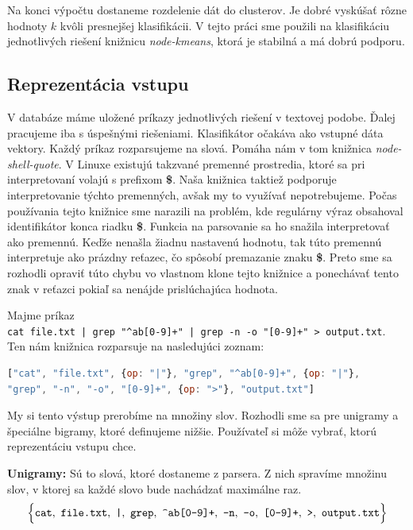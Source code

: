 Na konci výpočtu dostaneme rozdelenie dát do clusterov. Je dobré vyskúšať rôzne hodnoty
$k$ kvôli presnejšej klasifikácii.
V tejto práci sme použili na klasifikáciu jednotlivých riešení
knižnicu \textit{node-kmeans}, ktorá je stabilná a má dobrú podporu.

\subsection{Reprezentácia vstupu}
\label{sec:solutionclusterizing:inputrepresentation}

V databáze máme uložené príkazy
jednotlivých riešení v textovej podobe. Ďalej pracujeme iba s úspešnými riešeniami.
Klasifikátor očakáva ako vstupné dáta vektory. Každý príkaz rozparsujeme na slová.
Pomáha nám v tom knižnica \textit{node-shell-quote}. V Linuxe existujú takzvané
premenné prostredia, ktoré sa pri interpretovaní volajú s prefixom \textbf{\$}.
Naša knižnica taktiež podporuje interpretovanie týchto premenných, avšak my to
využívať nepotrebujeme. Počas používania tejto knižnice sme narazili na problém,
kde regulárny výraz obsahoval identifikátor konca riadku \textbf{\$}.
Funkcia na parsovanie sa ho snažila interpretovať ako premennú. Keďže nenašla žiadnu
nastavenú hodnotu, tak túto premennú interpretuje ako prázdny reťazec, čo spôsobí
premazanie znaku \textbf{\$}. Preto sme sa rozhodli opraviť túto chybu vo vlastnom
klone tejto knižnice a ponechávať tento znak v reťazci pokiaľ sa nenájde prislúchajúca
hodnota.
\begin{prikl}
	Majme príkaz \\
	\verb'cat file.txt | grep "^ab[0-9]+" | grep -n -o "[0-9]+" > output.txt'. \\
	Ten nám knižnica rozparsuje na nasledujúci zoznam:
\begin{lstlisting}[language=JavaScript]
["cat", "file.txt", {op: "|"}, "grep", "^ab[0-9]+", {op: "|"},
"grep", "-n", "-o", "[0-9]+", {op: ">"}, "output.txt"]
\end{lstlisting}
\end{prikl}
\noindent My si tento výstup prerobíme na množiny slov. Rozhodli sme sa pre
unigramy a špeciálne bigramy, ktoré definujeme nižšie. Používateľ si môže
vybrať, ktorú reprezentáciu vstupu chce.

\noindent\textbf{Unigramy:} Sú to slová, ktoré dostaneme z parsera. Z nich spravíme
množinu slov, v ktorej sa každé slovo bude nachádzať maximálne raz.
$$\Big\{\verb'cat',~\verb'file.txt',~\verb'|',~\verb'grep',~\verb'^ab[0-9]+',~ \verb'-n',~\verb'-o',~\verb'[0-9]+',~\verb'>',~\verb'output.txt'\Big\}$$

